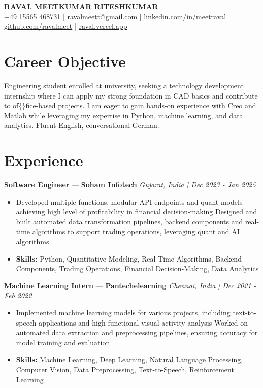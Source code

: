 \documentclass[a4paper,10pt]{article}
\begin{document}
\begin{center}
  {\Large\bfseries RAVAL MEETKUMAR RITESHKUMAR}\\[2pt]
  {\small +49 15565 468731 \;|\; \href{mailto:ravalmeett@gmail.com}{ravalmeett@gmail.com} \;|\; \href{https://www.linkedin.com/in/meetraval/}{linkedin.com/in/meetraval} \;|\; \href{https://github.com/ravalmeet}{github.com/ravalmeet} \;|\; \href{https://raval.vercel.app/}{raval.vercel.app}}
\end{center}
\vspace{-3pt}

\section*{Career Objective}
Engineering student enrolled at university, seeking a technology development internship where I can apply my strong foundation in CAD basics and contribute to of\{\}fice-based projects. I am eager to gain hands-on experience with Creo and Matlab while leveraging my expertise in Python, machine learning, and data analytics. Fluent English, conversational German.\par

\section*{Experience}
\textbf{Software Engineer} — \textbf{Soham Infotech} \hfill \textit{Gujarat, India \;|\; Dec 2023 - Jan 2025}\par
\vspace{1pt}
\begin{itemize}
  \item Developed multiple functions, modular API endpoints and quant models achieving high level of profitability in financial decision-making Designed and built automated data transformation pipelines, backend components and real-time algorithms to support trading operations, leveraging quant and AI algorithms
  \item \textbf{Skills:} Python, Quantitative Modeling, Real-Time Algorithms, Backend Components, Trading Operations, Financial Decision-Making, Data Analytics
\end{itemize}
\vspace{3pt}
\textbf{Machine Learning Intern} — \textbf{Pantechelearning} \hfill \textit{Chennai, India \;|\; Dec 2021 - Feb 2022}\par
\vspace{1pt}
\begin{itemize}
  \item Implemented machine learning models for various projects, including text-to-speech applications and high functional visual-activity analysis Worked on automated data extraction and preprocessing pipelines, ensuring accuracy for model training and evaluation
  \item \textbf{Skills:} Machine Learning, Deep Learning, Natural Language Processing, Computer Vision, Data Preprocessing, Text-to-Speech, Reinforcement Learning
\end{itemize}
\end{document}
